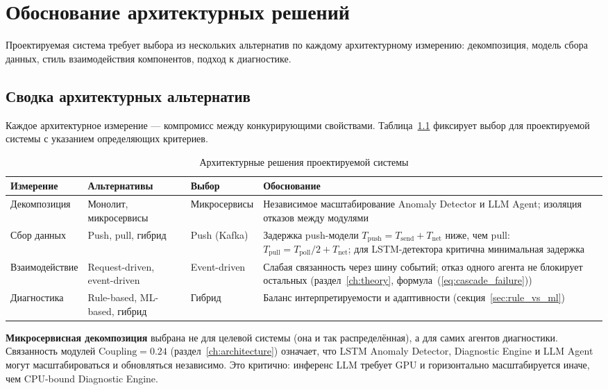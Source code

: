 \chapter{Обоснование архитектурных решений}\label{ch:comparing}

Проектируемая система требует выбора из нескольких альтернатив по каждому архитектурному измерению: декомпозиция, модель сбора данных, стиль взаимодействия компонентов, подход к диагностике.
\section{Сводка архитектурных альтернатив}

Каждое архитектурное измерение --- компромисс между конкурирующими свойствами. Таблица~\ref{tab:architecture_decisions} фиксирует выбор для проектируемой системы с указанием определяющих критериев.

\begin{table}[H]
\centering
\caption{Архитектурные решения проектируемой системы}
\label{tab:architecture_decisions}
\small
\begin{tabularx}{\textwidth}{|p{2.2cm}|p{2.2cm}|p{2cm}|X|}
\hline
\textbf{Измерение} & \textbf{Альтернативы} & \textbf{Выбор} & \textbf{Обоснование} \\
\hline
Декомпозиция & Монолит, микро\-сервисы & Микро\-сервисы & Независимое масштабирование Anomaly Detector и LLM Agent; изоляция отказов между модулями \\
\hline
Сбор данных & Push, pull, гибрид & Push (Kafka) & Задержка push-модели $T_{\text{push}} = T_{\text{send}} + T_{\text{net}}$ ниже, чем pull: $T_{\text{pull}} = T_{\text{poll}}/2 + T_{\text{net}}$; для LSTM-детектора критична минимальная задержка \\
\hline
Взаимо\-действие & Request-driven, event-driven & Event-driven & Слабая связанность через шину событий; отказ одного агента не блокирует остальных (раздел~\ref{ch:theory}, формула~(\ref{eq:cascade_failure})) \\
\hline
Диагностика & Rule-based, ML-based, гибрид & Гибрид & Баланс интерпретируемости и адаптивности (секция~\ref{sec:rule_vs_ml}) \\
\hline
\end{tabularx}
\end{table}

\textbf{Микросервисная декомпозиция} выбрана не для целевой системы (она и так распределённая), а для самих агентов диагностики. Связанность модулей $\text{Coupling} = 0.24$ (раздел~\ref{ch:architecture}) означает, что LSTM Anomaly Detector, Diagnostic Engine и LLM Agent могут масштабироваться и обновляться независимо. Это критично: инференс LLM требует GPU и горизонтально масштабируется иначе, чем CPU-bound Diagnostic Engine.

